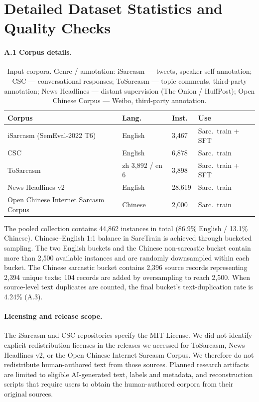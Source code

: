\section{Detailed Dataset Statistics and Quality Checks}
\label{app:data}

\paragraph{A.1 Corpus details.}

\begin{table}[h]
  \centering
  \small
  \begin{tabular}{@{}p{2.3cm}p{1.3cm}p{0.9cm}p{1.6cm}@{}}
    \toprule
    \textbf{Corpus} & \textbf{Lang.} & \textbf{Inst.} & \textbf{Use} \\
    \midrule
    iSarcasm (SemEval-2022 T6) & English & 3{,}467 & Sarc.\ train + SFT \\
    CSC & English & 6{,}878 & Sarc.\ train \\
    ToSarcasm & zh 3{,}892 / en 6 & 3{,}898 & Sarc.\ train + SFT \\
    News Headlines v2 & English & 28{,}619 & Sarc.\ train \\
    Open Chinese Internet Sarcasm Corpus & Chinese & 2{,}000 & Sarc.\ train \\
    \bottomrule
  \end{tabular}
  \caption{Input corpora. Genre / annotation: iSarcasm --- tweets, speaker self-annotation; CSC --- conversational responses; ToSarcasm --- topic comments, third-party annotation; News Headlines --- distant supervision (The Onion / HuffPost); Open Chinese Corpus --- Weibo, third-party annotation.}
  \label{tab:sources}
\end{table}

The pooled collection contains 44{,}862 instances in total (86.9\% English / 13.1\% Chinese). Chinese--English 1:1 balance in SarcTrain is achieved through bucketed sampling. The two English buckets and the Chinese non-sarcastic bucket contain more than 2{,}500 available instances and are randomly downsampled within each bucket. The Chinese sarcastic bucket contains 2{,}396 source records representing 2{,}394 unique texts; 104 records are added by oversampling to reach 2{,}500. When source-level text duplicates are counted, the final bucket's text-duplication rate is 4.24\% (A.3).

\paragraph{Licensing and release scope.} The iSarcasm and CSC repositories specify the MIT License. We did not identify explicit redistribution licenses in the releases we accessed for ToSarcasm, News Headlines v2, or the Open Chinese Internet Sarcasm Corpus. We therefore do not redistribute human-authored text from those sources. Planned research artifacts are limited to eligible AI-generated text, labels and metadata, and reconstruction scripts that require users to obtain the human-authored corpora from their original sources.

